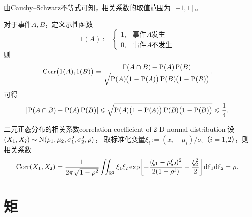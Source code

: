 \begin{corollary}
	由Cauchy--Schwarz不等式可知，相关系数的取值范围为$[-1,1]$。
\end{corollary}

\begin{corollary}
	对于事件$A,B$，定义示性函数
	\begin{equation}
		1(A) := \begin{cases}
			1,&\text{事件$A$发生}\\
			0,&\text{事件$A$不发生}
		\end{cases}
	\end{equation}
	则
	\begin{equation}
		\operatorname{Corr}\bigl(1(A),1(B)\bigr) = \frac{\operatorname{P}(A \cap B) - \operatorname{P}(A)\operatorname{P}(B)}{\sqrt{\operatorname{P}(A)\bigl(1 - \operatorname{P}(A)\bigr)\operatorname{P}(B)\bigl(1 - \operatorname{P}(B)\bigr)}}.
	\end{equation}
	可得
	\begin{equation}
		\lvert\operatorname{P}(A \cap B) - \operatorname{P}(A)\operatorname{P}(B)\rvert \leqslant \sqrt{\operatorname{P}(A)\bigl(1 - \operatorname{P}(A)\bigr)\operatorname{P}(B)\bigl(1 - \operatorname{P}(B)\bigr)} \leqslant \frac14.
	\end{equation}
\end{corollary}

\begin{example}{二元正态分布的相关系数}{correlation coefficient of 2-D normal distribution}
	设$(X_1,X_2) \sim \operatorname{N}(\mu_1,\mu_2,\sigma_1^2,\sigma_2^2,\rho)$，
	取标准化变量$\xi_i := (x_i - \mu_i)/\sigma_i$（$i = 1,2$），则相关系数
	\[
		\operatorname{Corr}(X_1,X_2) = \frac1{2\pi\sqrt{1 - \rho^2}}\iint_{\mathbb{R}^2}\xi_1\xi_2\exp\biggl[-\frac{(\xi_1 - \rho\xi_2)^2}{2(1 - \rho^2)} - \frac{\xi_2^2}2\biggr]\mathop{}\!\mathrm{d}\xi_1\mathrm{d}\xi_2 = \rho.
	\]
\end{example}

\section{矩}

